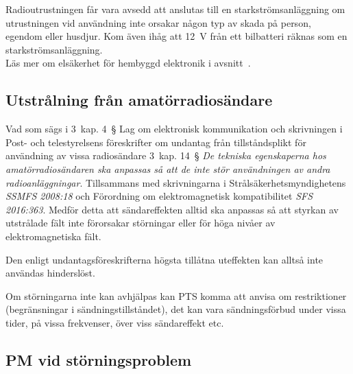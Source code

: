 Radioutrustningen får vara avsedd att anslutas till en starkströmsanläggning
om utrustningen vid användning inte orsakar någon typ av skada på person,
egendom eller husdjur.
Kom även ihåg att \qty{12}{\volt} från ett bilbatteri räknas som en
starkströmsanläggning.\\

Läs mer om elsäkerhet för hembyggd elektronik i
avsnitt~.

\subsection{Utstrålning från amatörradiosändare}

Vad som sägs i 3~kap. 4~\S{} Lag om elektronisk kommunikation och skrivningen i
Post- och telestyrelsens föreskrifter om undantag från tillståndsplikt för
användning av vissa radiosändare 3~kap. 14~\S{}
\emph{De tekniska egenskaperna hos
	amatörradiosändaren ska anpassas så att de inte stör användningen av andra
	radioanläggningar}.
Tillsammans med skrivningarna i Strålsäkerhetsmyndighetens \emph{SSMFS 2008:18}
och Förordning om elektromagnetisk kompatibilitet \emph{SFS 2016:363}.
Medför detta att sändareffekten alltid ska anpassas så att styrkan av utstrålade
fält inte förorsakar störningar eller för höga nivåer av elektromagnetiska fält.

Den enligt undantagsföreskrifterna högsta tillåtna uteffekten kan alltså inte
användas hinderslöst.

Om störningarna inte kan avhjälpas kan PTS komma att anvisa om restriktioner
(begränsningar i sändningstillståndet), det kan vara sändningsförbud under
vissa tider, på vissa frekvenser, över viss sändareffekt etc.

\subsection{PM vid störningsproblem}

